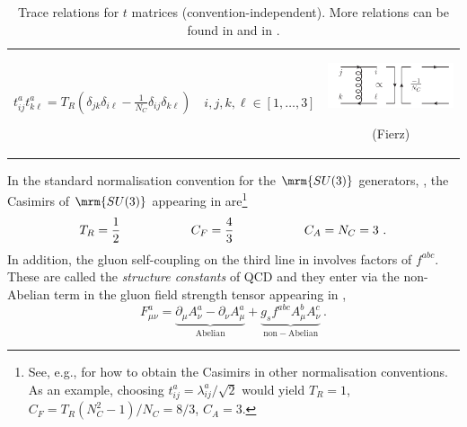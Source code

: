\begin{table}
\begin{center}
{\begin{tabular}{ccc}
$ t^a_{ij}t^a_{k\ell} = T_R \left(\delta_{jk}\delta_{i\ell}
- \frac{1}{N_C}\delta_{ij}\delta_{k\ell}\right)$ & $i,j,k,\ell\in[1,\ldots,3]$
& \parbox[c]{4cm}{\includegraphics*[scale=0.5]{traces4}}\hspace*{-0.2cm}(Fierz)\\
\bottomrule
\end{tabular}}
\caption{Trace relations for $t$ matrices (convention-independent). 
 More relations
  can be found in \cite[Section 1.2]{Ellis:1991qj} and in 
  \cite[Appendix A.3]{Peskin:1995ev}.
\label{tab:lambda}}
\end{center}
\end{table}
In the standard normalisation convention for the $\mrm{SU(3)}$ generators,
, the Casimirs of $\mrm{SU(3)}$ appearing in
 are\footnote{See, e.g., \cite[Appendix
    A.3]{Peskin:1995ev} for how to obtain the Casimirs in other
  normalisation conventions. As an example, choosing $t^a_{ij} = \lambda_{ij}^a/\sqrt{2}$ would yield $T_R=1$, $C_F=T_R(N_C^2-1)/N_C=8/3$, $C_A=3$.} 
\begin{equation}
T_R = \frac12 \hspace*{2cm} C_F = \frac43 \hspace*{2cm} C_A = N_C = 3~.
\end{equation}
In addition, the gluon self-coupling on the third line in
 involves factors of $f^{abc}$. These
%
are called the \emph{structure constants} of QCD and they enter via 
the non-Abelian term in the gluon field strength tensor appearing in
, 
\begin{equation}
F^a_{\mu\nu} = \underbrace{\partial_\mu A_\nu^a - \partial_\nu
  A^a_\mu}_{\mathrm{Abelian}} +
\underbrace{ g_s f^{abc} A_\mu^b A_\nu^c}_{\mathrm{non-Abelian}}~. \label{eq:F}
\end{equation}

